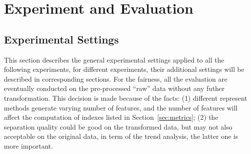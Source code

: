 \chapter{Experiment and Evaluation}

\section{Experimental Settings}
This section describes the general experimental settings applied to all the following experiments, for different experiments, their additional settings will be described in corresponding sections. For the fairness, all the evaluation are eventually conducted on the pre-processed ``raw'' data without any futher transformation. This decision is made because of the facts: (1)
different represent methods generate varying number of features, and the number of features will affect the computation of indexes listed in Section~\ref{sec:metrics}; (2) the separation quality could be good on the transformed data, but may not also acceptable on the original data, in term of the trend analysis, the latter one is more important. 

